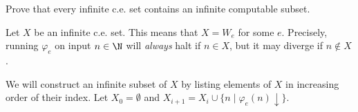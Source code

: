 \begin{problem}
  Prove that every infinite c.e. set contains an infinite computable subset.

  \begin{answer}
    Let $X$ be an infinite c.e. set.
    This means that $X = W_e$ for some $e$.
    Precisely, running $\varphi_e$ on input $n \in \N$ will \emph{always}
    halt if $n \in X$, but it may diverge if $n \not \in X$.

    We will construct an infinite subset of $X$ by listing elements of $X$ in
    increasing order of their index. Let $X_0 = \emptyset$ and $X_{i+1} = X_i
    \cup \{n \mid \varphi_{e}(n) \downarrow\}$.
  \end{answer}
\end{problem}
